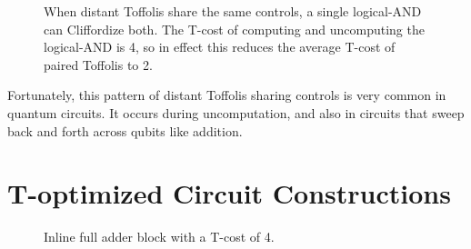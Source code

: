 \documentclass[twocolumn,longbibliography]{quantumarticle-customized}
\begin{document}
\begin{figure}
  \caption{
	When distant Toffolis share the same controls, a single logical-AND can Cliffordize both.
    The T-cost of computing and uncomputing the logical-AND is 4, so in effect this reduces the average T-cost of paired Toffolis to 2.
  }
  \label{fig:paired-toffoli-to-logical-and}
\end{figure}

Fortunately, this pattern of distant Toffolis sharing controls is very common in quantum circuits.
It occurs during uncomputation, and also in circuits that sweep back and forth across qubits like addition.


\section{T-optimized Circuit Constructions}
\label{sec:circuit-constructions}


\begin{figure}
  \caption{
	Inline full adder block with a T-cost of 4.
  }
  \label{fig:addition}
\end{figure}
\end{document}
